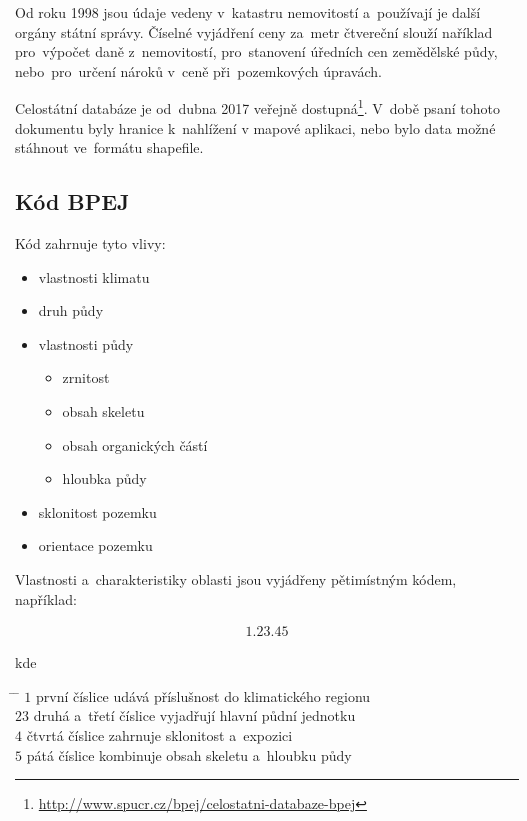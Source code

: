 Od roku 1998 jsou údaje  vedeny v~katastru nemovitostí a~používají je další orgány státní správy. Číselné vyjádření ceny  za~metr čtvereční slouží naříklad pro~výpočet daně z~nemovitostí, pro~stanovení úředních cen zemědělské půdy, nebo~pro~určení nároků v~ceně při~pozemkových úpravách.

Celostátní databáze  je od~dubna 2017 veřejně dostupná\footnote{\url{http://www.spucr.cz/bpej/celostatni-databaze-bpej}}. V~době psaní tohoto dokumentu byly hranice  k~nahlížení v mapové aplikaci, nebo bylo data možné stáhnout ve~formátu shapefile.

\subsection{Kód BPEJ}
\label{kod_bpej}

Kód  zahrnuje tyto vlivy:
	\begin{itemize}[leftmargin=1.5cm, noitemsep]
		\item vlastnosti klimatu
		\item druh půdy
		\item vlastnosti půdy
			\begin{itemize}[leftmargin=1cm, noitemsep]
				\item zrnitost
				\item obsah skeletu
				\item obsah organických částí
				\item hloubka půdy
			\end{itemize}
		\item sklonitost pozemku
		\item orientace pozemku
	\end{itemize}

Vlastnosti a~charakteristiky oblasti  jsou vyjádřeny pětimístným kódem, například:

\begin{align*}
	1.23.45
\end{align*}

kde
\begin{tabbing}
\hspace{2em} \= \hspace{5em} \= \kill
	\> $1$	\> první číslice udává příslušnost do klimatického regionu \\
	\> $23$	\> druhá a~třetí číslice vyjadřují hlavní půdní jednotku \\
	\> $4$	\> čtvrtá číslice zahrnuje sklonitost a~expozici\\
	\> $5$	\> pátá číslice kombinuje obsah skeletu a~hloubku půdy
\end{tabbing}

